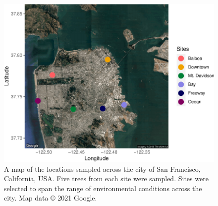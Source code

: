 \documentclass[fleqn,10pt,lineno]{wlpeerj} %
\begin{document}
\begin{figure}[p!]
\includegraphics{gibson2023_files/figure-latex/site-map-1} \caption{A map of the locations sampled across the city of San Francisco, California, USA. Five trees from each site were sampled. Sites were selected to span the range of environmental conditions across the city. Map data © 2021 Google.}\label{fig:site-map}
\end{figure}
\end{document}
